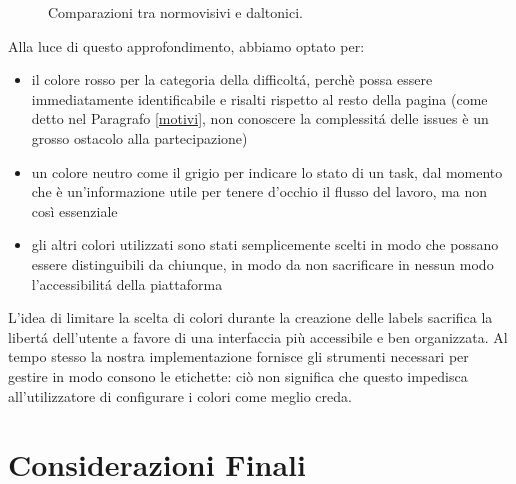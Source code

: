 \documentclass[12pt]{article} %
\begin{document}
\begin{figure}[H] 
\caption{Comparazioni tra normovisivi e daltonici.}
\label{fig:daltonici}
\end{figure}

Alla luce di questo approfondimento, abbiamo optato per:
\begin{itemize}
\item il colore rosso per la categoria della difficolt\'a, perch\`e possa essere immediatamente identificabile e risalti rispetto al resto della pagina (come detto nel Paragrafo \ref{motivi}, non conoscere la complessit\'a delle issues \`e un grosso ostacolo alla partecipazione)
\item un colore neutro come il grigio per indicare lo stato di un task, dal momento che \`e un'informazione utile per tenere d'occhio il flusso del lavoro, ma non così essenziale
\item gli altri colori utilizzati sono stati semplicemente scelti in modo che possano essere distinguibili da chiunque, in modo da non sacrificare in nessun modo l'accessibilit\'a della piattaforma 
\end{itemize}
L'idea di limitare la scelta di colori durante la creazione delle labels sacrifica la libert\'a dell'utente a favore di una interfaccia più accessibile e ben organizzata. Al tempo stesso la nostra implementazione fornisce gli strumenti necessari per gestire in modo consono le etichette: ciò non significa che questo impedisca all'utilizzatore di configurare i colori come meglio creda.

\newpage
\section{Considerazioni Finali}
\end{document}
